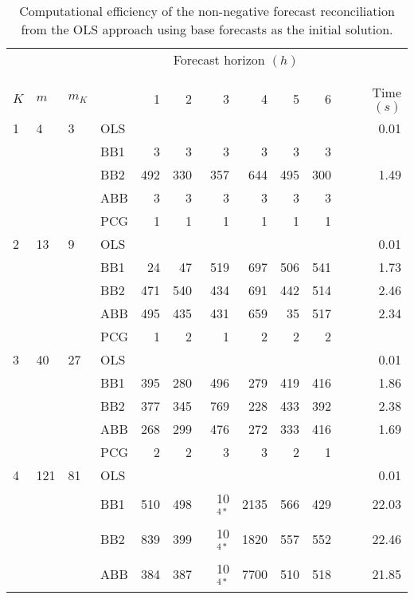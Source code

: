 \documentclass[11pt]{article}
\newcommand{\0}{\phantom{0}}
\begin{document}
\begin{table}[ht]
	\small
	\tabcolsep=0.20cm
	\caption{Computational efficiency of the non-negative forecast reconciliation from the OLS approach using base forecasts as the initial solution.}
	\label{tbl:perfnnolsb}
	\centering
	\begin{threeparttable}
		\begin{tabular}{llllrrrrrrr}
			\toprule
			& & & & \multicolumn{6}{c}{Forecast horizon $(h)$}\\[-0.3cm]\\\cline{5-10}\\[-0.3cm]
			$K$ & $m$ & $m_{K}$ & & 1 & 2 & 3 & 4 & 5 & 6 & Time $(s)$\\
			\midrule
			1 & 4 & 3 & OLS & & & & & & & 0.01\\
			& & & BB1 & 3 & 3 & 3 & 3 & 3 & 3 & \pmb{$0.03$} \\
			& & & BB2 & 492 & 330 & 357 & 644 & 495 & 300 & 1.49 \\
			& & & ABB & 3 & 3 & 3 & 3 & 3 & 3 & \pmb{$0.03$} \\
			& & & PCG & 1 & 1 & 1 & 1 & 1 & 1 & \pmb{$0.03$} \\
			\midrule
			2 & 13 & 9 & OLS & & & & & & & 0.01 \\
			& & & BB1 & 24 & 47 & 519 & 697 & 506 & 541 & 1.73 \\			
			& & & BB2 & 471 & 540 & 434 & 691 & 442 & 514 & 2.46 \\
			& & & ABB & 495 & 435 & 431 & 659 & 35 & 517 & 2.34 \\
			& & & PCG & 1 & 2 & 1 & 2 & 2 & 2 & \pmb{$0.11$} \\
			\midrule
			3 & 40 & 27 & OLS & & & & & & & 0.01 \\
			& & & BB1 & 395 & 280 & 496 & 279 & 419 & 416 & 1.86 \\
			& & & BB2 & 377 & 345 & 769 & 228 & 433 & 392 & 2.38 \\
			& & & ABB & 268 & 299 & 476 & 272 & 333 & 416 & 1.69 \\
			& & & PCG & 2 & 2 & 3 & 3 & 2 & 1 & \pmb{$0.15$} \\
			\midrule		
			4 & 121 & 81 & OLS & & & & & & & 0.01 \\
			& & & BB1 & 510 & 498 & 10$^{4*}$ & 2135 & 566 & 429 & 22.03 \\
			& & & BB2 & 839 & 399 & 10$^{4*}$ & 1820 & 557 & 552 & 22.46 \\
			& & & ABB & 384 & 387 & 10$^{4*}$ & 7700 & 510 & 518 & 21.85 \\

\end{tabular}
\end{threeparttable}
\end{table}
\end{document}
